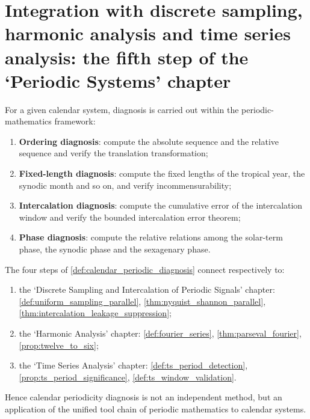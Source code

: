 \section{Integration with discrete sampling, harmonic analysis and time series analysis: the fifth step of the `Periodic Systems' chapter}
\label{sec:calendar_integration}

\begin{definition}\label{def:calendar_periodic_diagnosis}
For a given calendar system, diagnosis is carried out within the periodic-mathematics framework:
\begin{enumerate}[label=(\roman*)]
    \item \textbf{Ordering diagnosis}: compute the absolute sequence and the relative sequence and verify the translation transformation;
    \item \textbf{Fixed-length diagnosis}: compute the fixed lengths of the tropical year, the synodic month and so on, and verify incommensurability;
    \item \textbf{Intercalation diagnosis}: compute the cumulative error of the intercalation window and verify the bounded intercalation error theorem;
    \item \textbf{Phase diagnosis}: compute the relative relations among the solar-term phase, the synodic phase and the sexagenary phase.
\end{enumerate}
\end{definition}

\begin{theorem}\label{thm:calendar_diagnosis_integration}
The four steps of \cref{def:calendar_periodic_diagnosis} connect respectively to:
\begin{enumerate}[label=(\roman*)]
    \item the `Discrete Sampling and Intercalation of Periodic Signals' chapter: \cref{def:uniform_sampling_parallel}, \cref{thm:nyquist_shannon_parallel}, \cref{thm:intercalation_leakage_suppression};
    \item the `Harmonic Analysis' chapter: \cref{def:fourier_series}, \cref{thm:parseval_fourier}, \cref{prop:twelve_to_six};
    \item the `Time Series Analysis' chapter: \cref{def:ts_period_detection}, \cref{prop:ts_period_significance}, \cref{def:ts_window_validation}.
\end{enumerate}
Hence calendar periodicity diagnosis is not an independent method, but an application of the unified tool chain of periodic mathematics to calendar systems.
\end{theorem}

